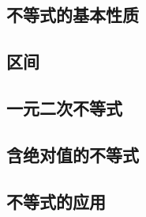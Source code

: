 \documentclass[a5paper]{article}
\begin{document}
\subsection{不等式的基本性质}

\subsection{区间}

\subsection{一元二次不等式}

\subsection{含绝对值的不等式}

\subsection{不等式的应用}
\end{document}
